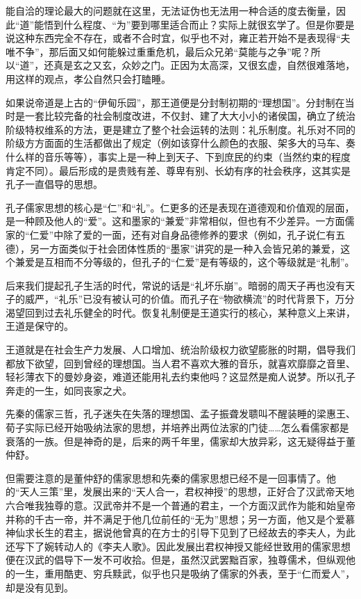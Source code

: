 \documentclass[
]{book}
\begin{document}
能自洽的理论最大的问题就在这里，无法证伪也无法用一种合适的度去衡量，因此``道''能悟到什么程度、``为''要到哪里适合而止？实际上就很玄学了。但是你要是说这种东西完全不存在，或者不合时宜，似乎也不对，雍正若开始不是表现得``夫唯不争''，那后面又如何能躲过重重危机，最后众兄弟``莫能与之争''呢？所以``道''，还真是玄之又玄，众妙之门。正因为太高深，又很玄虚，自然很难落地，用这样的观点，孝公自然只会打瞌睡。

如果说帝道是上古的``伊甸乐园''，那王道便是分封制初期的``理想国''。分封制在当时是一套比较完备的社会制度改进，不仅封、建了大大小小的诸侯国，确立了统治阶级特权维系的方法，更是建立了整个社会运转的法则：礼乐制度。礼乐对不同的阶级方方面面的生活都做出了规定（例如该穿什么颜色的衣服、架多大的马车、奏什么样的音乐等等），事实上是一种上到天子、下到庶民的约束（当然约束的程度肯定不同）。最后形成的是贵贱有差、尊卑有别、长幼有序的社会秩序，这其实是孔子一直倡导的思想。

孔子儒家思想的核心是``仁''和``礼''。仁更多的还是表现在道德观和价值观的层面，是一种顾及他人的``爱''。这和墨家的``兼爱''非常相似，但也有不少差异。一方面儒家的``仁爱''中除了爱的一面，还有对自身品德修养的要求（例如，孔子说仁有五德），另一方面类似于社会团体性质的``墨家''讲究的是一种入会皆兄弟的兼爱，这个兼爱是互相而不分等级的，但孔子的``仁爱''是有等级的，这个等级就是``礼制''。

后来我们提起孔子生活的时代，常说的话是``礼坏乐崩''。暗弱的周天子再也没有天子的威严，``礼乐''已没有被认可的价值。而孔子在``物欲横流''的时代背景下，万分渴望回到过去礼乐健全的时代。恢复礼制便是王道实行的核心，某种意义上来讲，王道是保守的。

王道就是在社会生产力发展、人口增加、统治阶级权力欲望膨胀的时期，倡导我们都放下欲望，回到曾经的理想国。当人君不喜欢大雅的音乐，就喜欢靡靡之音里、轻衫薄衣下的曼妙身姿，难道还能用礼去约束他吗？这显然是痴人说梦。所以孔子奔走的一生，如同丧家之犬。

先秦的儒家三哲，孔子迷失在失落的理想国、孟子振聋发聩叫不醒装睡的梁惠王、荀子实际已经开始吸纳法家的思想，并培养出两位法家的门徒\ldots\ldots 怎么看儒家都是衰落的一族。但是神奇的是，后来的两千年里，儒家却大放异彩，这无疑得益于董仲舒。

但需要注意的是董仲舒的儒家思想和先秦的儒家思想已经不是一回事情了。他的``天人三策''里，发展出来的``天人合一，君权神授''的思想，正好合了汉武帝天地六合唯我独尊的意。汉武帝并不是一个普通的君主，一个方面汉武作为能和始皇帝并称的千古一帝，并不满足于他几位前任的``无为''思想；另一方面，他又是个爱慕神仙求长生的君主，据说他曾真的在方士的引导下见到了已经故去的李夫人，为此还写下了婉转动人的《李夫人歌》。因此发展出君权神授又能经世致用的儒家思想便在汉武的倡导下一发不可收拾。但是，虽然汉武罢黜百家，独尊儒术，但纵观他的一生，重用酷吏、穷兵黩武，似乎也只是吸纳了儒家的外表，至于``仁而爱人''，却是没有见到。
\end{document}
